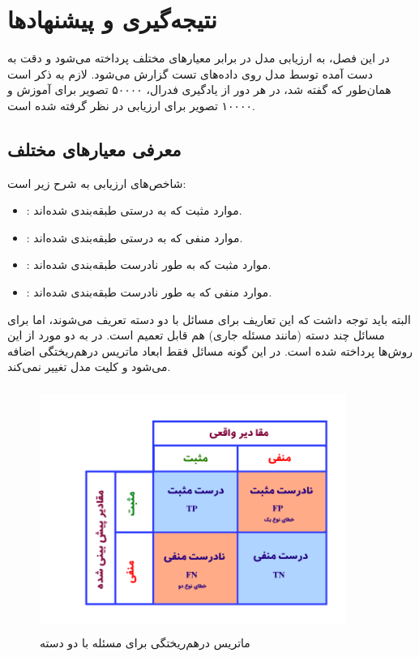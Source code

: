 \chapter{نتیجه‌گیری و پیشنهادها}


در این فصل، به ارزیابی مدل در برابر معیارهای مختلف پرداخته می‌شود و دقت‌ به دست آمده توسط مدل روی داده‌های تست گزارش می‌شود. لازم به ذکر است همان‌طور که گفته شد، در هر دور از یادگیری فدرال، ۵۰۰۰۰ تصویر برای آموزش و ۱۰۰۰۰ تصویر برای ارزیابی در نظر گرفته شده است.

\section{معرفی معیارهای مختلف}

شاخص‌های ارزیابی به شرح زیر است:

\begin{itemize}
    \item \textbf{}: موارد مثبت که به درستی طبقه‌بندی شده‌اند.
    \item \textbf{}: موارد منفی که به درستی طبقه‌بندی شده‌اند.
    \item \textbf{}: موارد مثبت که به طور نادرست طبقه‌بندی شده‌اند.
    \item \textbf{}: موارد منفی که به طور نادرست طبقه‌بندی شده‌اند.
\end{itemize}

البته باید توجه داشت که این تعاریف برای مسائل با دو دسته تعریف می‌شوند، اما برای مسائل چند دسته (مانند مسئله جاری) هم قابل تعمیم است. در \cite{b9} به دو مورد از این روش‌ها پرداخته شده است. در این گونه مسائل فقط ابعاد ماتریس درهم‌ریختگی اضافه می‌شود و کلیت مدل تغییر نمی‌کند.

\begin{figure}[H]
    \centering
   \includegraphics[height=8cm,width=10cm]{./confusion/Actual_Predicted.png}
   \caption{ ماتریس درهم‌ریختگی برای مسئله با دو دسته}
   \label{Confusion}
   \centering
\end{figure}

